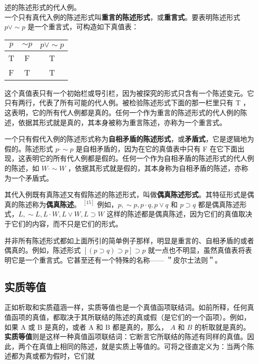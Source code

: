 述的陈述形式的代人例。\\
一个只有真代入例的陈述形式叫\textbf{重言的陈述形式}，或\textbf{重言式}。要表明陈述形式 $p \vee \sim p$ 是一个重言式，可构造如下真值表：

\begin{center}
\begin{tabular}{|ccc|}
\hline
$p$ & $\sim p$ & $p \vee \sim p$ \\
\hline
T & F & T \\
F & T & T \\
\hline
\end{tabular}
\end{center}

这个真值表只有一个初始栏或导引栏，因为被探究的形式只含有一个陈述变元。它只有两行，代表了所有可能的代人例。被检验陈述形式下面的那一栏里只有 T ，这表明，它的所有代人例都是真的。任何一个作为重言的陈述形式的代人例的陈述，依据其形式就是真的，其本身被称为重言陈述，亦称为一个重言式。

一个只有假代入例的陈述形式称为\textbf{自相矛盾的陈述形式}，或\textbf{矛盾式}，它是逻辑地为假的。陈述形式 $p \cdot \sim p$ 是自相矛盾的，因为在它的真值表中只有 F 在它下面出现，这表明它的所有代人例都是假的。任何一个作为自相矛盾的陈述形式的代人例的陈述，如 $W \cdot \sim W$ ，依据其形式就是假的，其本身称为自相矛盾的陈述，亦称为一个矛盾式。

其代入例既有真陈述又有假陈述的陈述形式，叫做\textbf{偶真陈述形式}。其特征形式是偶真的陈述称为\textbf{偶真陈述}。 ${ }^{[15]}$ 例如，$p, \sim p, p \cdot q, p \vee q$ 和 $p \supset q$ 都是偶真陈述形式，$L, \sim L, L \cdot W, L \vee W, L \supset W$ 这样的陈述都是偶真陈述，因为它们的真值取决于它们的内容，而不只是它们的形式。

并非所有陈述形式都如上面所引的简单例子那样，明显是重言的、自相矛盾的或者偶真的。例如，陈述形式 $[(p \supset q) \supset p] \supset p$ 就一点也不明显，虽然真值表将表明它是一个重言式。它甚至还有一个特殊的名称—— ＂皮尔士法则＂。

\subsection{实质等值}
正如析取和实质蕴涵一样，实质等值也是一个真值函项联结词。如前所释，任何真值函项的真值，都取决于其所联结的陈述的真或假（是它们的一个函项）。例如，如果 A 或 B 是真的，或者 A 和 B 都是真的，那么， $A$ 和 $B$ 的析取就是真的。\textbf{实质等值}则是这样一种真值函项联结词：它断言它所联结的陈述有同样的真值。因此，两个在真值上相同的陈述，就是实质上等值的。可将之径直定义为：当两个陈述都为真或都为假时，它们就

